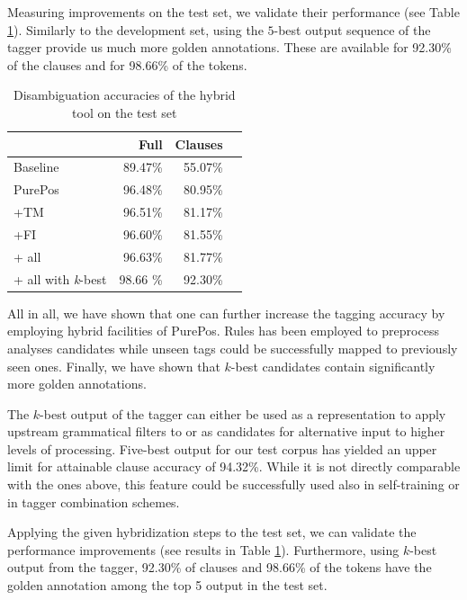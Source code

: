 Measuring improvements on the test set, we validate their performance (see Table \ref{tab:oldhun-test}). 
Similarly to the development set, using the $5$-best output sequence of the tagger provide us much more golden annotations. 
These are available for 92.30\% of the clauses and for 98.66\% of the tokens.

\begin{table}[ht]
\centering
\caption{Disambiguation accuracies of the hybrid tool on the test set}
\label{tab:oldhun-test}
\begin{tabular}{l r r r}
\hline
 & Full & Clauses  \\
\hline
Baseline  & 89.47\% & 55.07\% \\
PurePos  & 96.48\% & 80.95\% \\
+TM  & 96.51\% & 81.17\% \\
+FI  & 96.60\% & 81.55\% \\
+ all  & 96.63\% & 81.77\% \\
+ all with \emph{k}-best  & 98.66 \% & 92.30\% \\
\hline
\end{tabular}
\end{table}
 

All in all, we have shown that one can further increase the tagging accuracy by employing hybrid facilities of PurePos. 
Rules has been employed to preprocess analyses candidates while unseen tags could be successfully mapped to previously seen ones. 
Finally, we have shown that $k$-best candidates contain significantly more golden annotations.



The $k$-best output of the tagger can either be used as a representation to apply upstream grammatical filters to or as candidates for alternative input to higher levels of processing.
Five-best output for our test corpus has yielded an upper limit for attainable clause accuracy of 94.32\%.
While it is not directly comparable with the ones above, this feature could be successfully used also in self-training or in tagger combination schemes.

Applying the given hybridization steps to the test set, we can validate the performance improvements (see results in Table \ref{tab:oldhun-test}).
Furthermore, using $k$-best output from the tagger, 92.30\% of clauses and 98.66\% of the tokens have the golden annotation among the top 5 output in the test set. 


